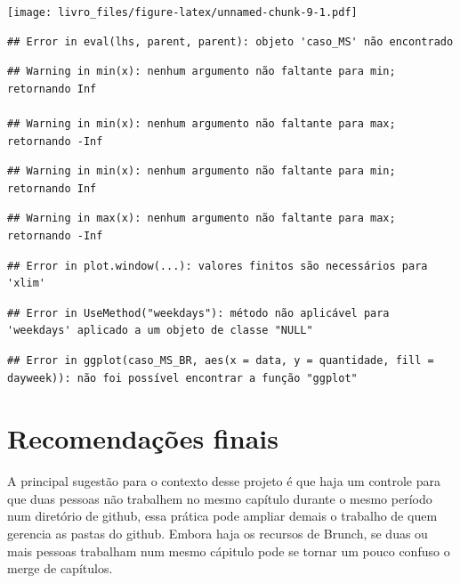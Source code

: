 \documentclass[
]{book}
\begin{document}
\texttt{[image: livro\_files/figure-latex/unnamed-chunk-9-1.pdf]}

\begin{verbatim}
## Error in eval(lhs, parent, parent): objeto 'caso_MS' não encontrado
\end{verbatim}

\begin{verbatim}
## Warning in min(x): nenhum argumento não faltante para min; retornando Inf

## Warning in min(x): nenhum argumento não faltante para max; retornando -Inf
\end{verbatim}

\begin{verbatim}
## Warning in min(x): nenhum argumento não faltante para min; retornando Inf
\end{verbatim}

\begin{verbatim}
## Warning in max(x): nenhum argumento não faltante para max; retornando -Inf
\end{verbatim}

\begin{verbatim}
## Error in plot.window(...): valores finitos são necessários para 'xlim'
\end{verbatim}

\begin{verbatim}
## Error in UseMethod("weekdays"): método não aplicável para 'weekdays' aplicado a um objeto de classe "NULL"
\end{verbatim}

\begin{verbatim}
## Error in ggplot(caso_MS_BR, aes(x = data, y = quantidade, fill = dayweek)): não foi possível encontrar a função "ggplot"
\end{verbatim}

\hypertarget{recomendauxe7uxf5es-finais}{%
\chapter{Recomendações finais}\label{recomendauxe7uxf5es-finais}}

A principal sugestão para o contexto desse
projeto é que haja um controle para que duas
pessoas não trabalhem no mesmo capítulo
durante o mesmo período num diretório de
github, essa prática pode ampliar demais o
trabalho de quem gerencia as pastas do
github. Embora haja os recursos de Brunch,
se duas ou mais pessoas trabalham num mesmo
cápitulo pode se tornar um pouco confuso o
merge de capítulos.
\end{document}
